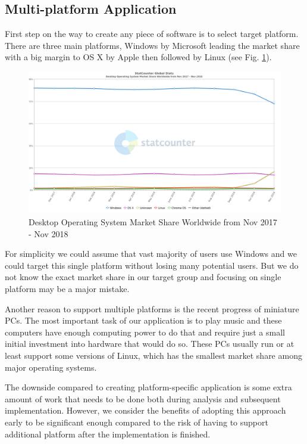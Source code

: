 \subsection{Multi-platform Application}

First step on the way to create any piece of software is to select target platform. There are three main platforms, Windows by Microsoft leading the market share with a big margin to OS X by Apple then followed by Linux (see Fig. \ref{fig01:osMarketShareChart}).

\begin{figure}[ht]\centering
\includegraphics[width=1.0\textwidth]{img/StatCounter-os_combined-ww-monthly-201711-201811}
\caption{Desktop Operating System Market Share Worldwide from Nov 2017 - Nov 2018~\citep{osMarketShare}}
\label{fig01:osMarketShareChart}
\end{figure}

For simplicity we could assume that vast majority of users use Windows and we could target this single platform without losing many potential users. But we do not know the exact market share in our target group and focusing on single platform may be a major mistake.
\par
Another reason to support multiple platforms is the recent progress of miniature PCs. The most important task of our application is to play music and these computers have enough computing power to do that and require just a small initial investment into hardware that would do so. These PCs usually run or at least support some versions of Linux, which has the smallest market share among major operating systems.
\par
The downside compared to creating platform-specific application is some extra amount of work that needs to be done both during analysis and subsequent implementation. However, we consider the benefits of adopting this approach early to be significant enough compared to the risk of having to support additional platform after the implementation is finished.
